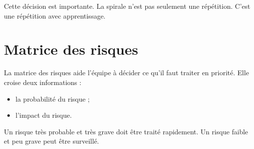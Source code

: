 \documentclass[12pt,a4paper]{article}
\begin{document}
Cette décision est importante. La spirale n'est pas seulement une répétition. C'est une répétition avec apprentissage.

\newpage

\section{Matrice des risques}

La matrice des risques aide l'équipe à décider ce qu'il faut traiter en priorité. Elle croise deux informations :

\begin{itemize}
    \item la probabilité du risque ;
    \item l'impact du risque.
\end{itemize}

Un risque très probable et très grave doit être traité rapidement. Un risque faible et peu grave peut être surveillé.
\end{document}
